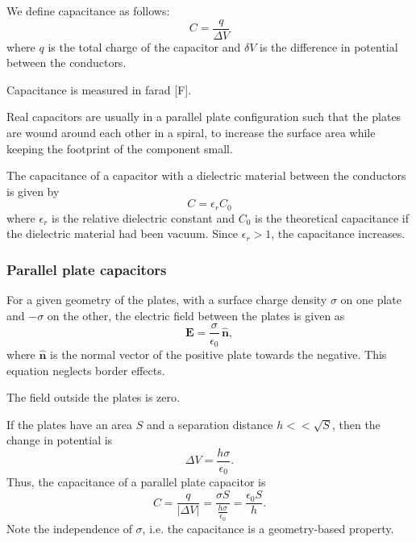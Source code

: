 \documentclass[a4paper, 12pt]{article}
\renewcommand{\vec}[1]{\bm{#1}}
\newcommand{\E}{\ensuremath{\vec{E}}}
\newcommand{\e}{\ensuremath{\epsilon_0}}
\let\tmp\hat
\renewcommand{\hat}[1]{\vec{\tmp{#1}}}
\begin{document}
    We define capacitance as follows:
    \begin{equation}
        C = \frac{q}{\Delta V}
    \end{equation}
    where $q$ is the total charge of the capacitor and $\delta V$ is the difference in potential between the conductors.
    
    Capacitance is measured in farad [F].
    
    Real capacitors are usually in a parallel plate configuration such that the plates are wound around each other in a spiral, 
    to increase the surface area while keeping the footprint of the component small.
    
    The capacitance of a capacitor with a dielectric material between the conductors is given by
    \begin{equation}
        C = \epsilon_rC_0
    \end{equation}
    where $\epsilon_r$ is the relative dielectric constant and $C_0$ is the theoretical capacitance 
    if the dielectric material had been vacuum. Since $\epsilon_r > 1$, the capacitance increases.
    
    \subsubsection{Parallel plate capacitors}
        For a given geometry of the plates, with a surface charge density $\sigma$ on one plate and $-\sigma$ on the other, 
        the electric field between the plates is given as 
        \begin{equation}
            \E = \frac{\sigma}{\e}\,\hat{n},
        \end{equation}
        where $\hat{n}$ is the normal vector of the positive plate towards the negative. This equation neglects border effects.
        
        The field outside the plates is zero.
        
        If the plates have an area $S$ and a separation distance $h << \sqrt{S}$, then the change in potential is
        \begin{equation}
            \Delta V = \frac{h\sigma}{\e}.
        \end{equation}
        Thus, the capacitance of a parallel plate capacitor is
        \begin{equation}
            C = \frac{q}{|\Delta V|} = \frac{\sigma S}{\frac{h\sigma}{\e}} = \frac{\e S}{h}.
        \end{equation}
        Note the independence of $\sigma$, i.e. the capacitance is a geometry-based property.
\end{document}
